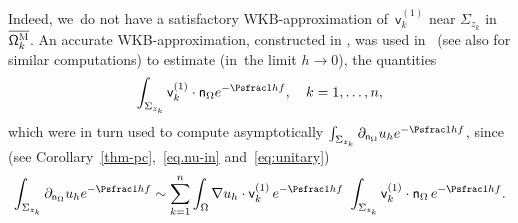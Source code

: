 Indeed, we~do not
have a
satisfactory
WKB-approximation of~$ \mathsf v_k^{(1)} $ near
$\Sigma_{z_k}$ in $\overline{\mathsf \Omega_k^{\textsc{M}}}$.
An accurate WKB-approximation, constructed in \cite{helffer-nier-06}, was used in~\cite{DLLN} (see also
\cite{DLLN-saddle1}
for similar computations) to estimate
(in~the limit $h \to 0$), the quantities
\begin{equation}\label{eq.int-bordvk}
\int_{\Sigma_{z_k}} \mathsf v_k^{(1)} \cdot \mathsf n_{\Omega} e^{-\Psfrac 1hf}, \quad k=1,\ldots,n,
\end{equation}
which were in turn used to compute asymptotically $\int_{\Sigma_{z_k}}\partial_{\mathsf n_\Omega}u_h e^{-\Psfrac 1hf}$, since (see Corollary~\ref{thm-pc},~\eqref{eq.nu-in} and~\eqref{eq:unitary})
\[
\int_{\Sigma_{z_k}}\partial_{\mathsf n_\Omega}u_h e^{-\Psfrac 1hf}\sim
\sum_{k=1}^n \int_\Omega \nabla u_h\cdot \mathsf v_k^{(1)} \,
e^{-\Psfrac 1hf}\ \int_{\Sigma_{z_k}} \mathsf v_k^{(1)} \cdot \mathsf
n_{\Omega} \, e^{-\Psfrac 1hf}.
\]

